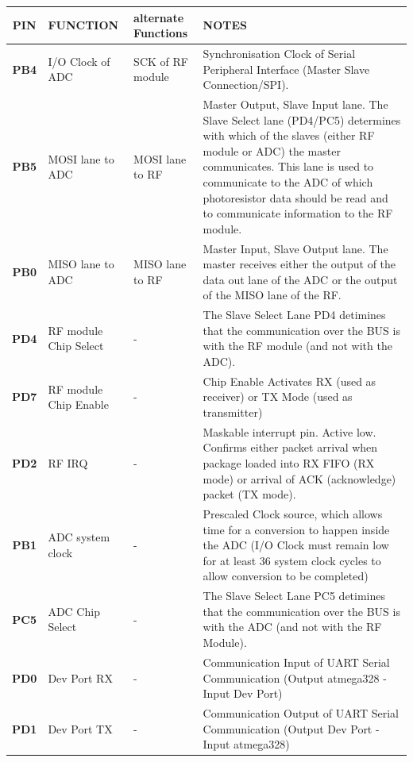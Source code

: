 \documentclass[12pt]{article}
\begin{document}
\small
\begin{tabular}{| c || p{30mm} | p{30mm} | p{60mm} |}
  \hline
  \textbf{PIN} & FUNCTION & alternate Functions & NOTES\\
  \hline
  \hline
  \textbf{PB4} & I/O Clock of ADC & SCK of RF module & Synchronisation Clock of Serial Peripheral Interface (Master Slave Connection/SPI).\\
  \hline
  \textbf{PB5} & MOSI lane to ADC & MOSI lane to RF & Master Output, Slave Input lane. The Slave Select lane (PD4/PC5) determines with which of the slaves (either RF module or ADC) the master communicates. This lane is used to communicate to the ADC of which photoresistor data should be read and to communicate information to the RF module.\\
  \hline
  \textbf{PB0} & MISO lane to ADC & MISO lane to RF & Master Input, Slave Output lane. The master receives either the output of the data out lane of the ADC or the output of the MISO lane of the RF.\\
  \hline
  \textbf{PD4} & RF module Chip Select & - & The Slave Select Lane PD4 detimines that the communication over the BUS is with the RF module (and not with the ADC).\\
  \hline
  \textbf{PD7} & RF module Chip Enable & - & Chip Enable Activates RX (used as receiver) or TX Mode (used as transmitter)\\
  \hline
  \textbf{PD2} & RF IRQ & - & Maskable interrupt pin. Active low. Confirms either packet arrival when package loaded into RX FIFO (RX mode) or arrival of ACK (acknowledge) packet (TX mode).\\
  \hline
  \textbf{PB1} & ADC system clock & - & Prescaled Clock source, which allows time for a conversion to happen inside the ADC (I/O Clock must remain low for at least 36 system clock cycles to allow conversion to be completed)\\
  \hline
  \textbf{PC5} & ADC Chip Select & - & The Slave Select Lane PC5 detimines that the communication over the BUS is with the ADC (and not with the RF Module).\\
  \hline
  \textbf{PD0} & Dev Port RX & - & Communication Input of UART Serial Communication (Output atmega328 - Input Dev Port)\\
  \hline
  \textbf{PD1} & Dev Port TX & - & Communication Output of UART Serial Communication (Output Dev Port - Input atmega328)\\
  \hline
\end{tabular}
\normalsize
\end{document}

